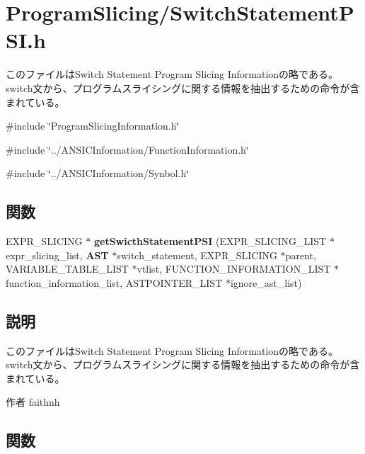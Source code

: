 \section{ProgramSlicing/SwitchStatementPSI.h}
\label{SwitchStatementPSI_8h}


このファイルはSwitch Statement Program Slicing Informationの略である。 switch文から、プログラムスライシングに関する情報を抽出するための命令が含まれている。  


{\ttfamily \#include \char`\"{}ProgramSlicingInformation.h\char`\"{}}\par
{\ttfamily \#include \char`\"{}../ANSICInformation/FunctionInformation.h\char`\"{}}\par
{\ttfamily \#include \char`\"{}../ANSICInformation/Synbol.h\char`\"{}}\par
\subsection*{関数}
\begin{DoxyCompactItemize}
\item 
EXPR\_\-SLICING $\ast$ {\bf getSwicthStatementPSI} (EXPR\_\-SLICING\_\-LIST $\ast$expr\_\-slicing\_\-list, {\bf AST} $\ast$switch\_\-statement, EXPR\_\-SLICING $\ast$parent, VARIABLE\_\-TABLE\_\-LIST $\ast$vtlist, FUNCTION\_\-INFORMATION\_\-LIST $\ast$function\_\-information\_\-list, ASTPOINTER\_\-LIST $\ast$ignore\_\-ast\_\-list)
\end{DoxyCompactItemize}


\subsection{説明}
このファイルはSwitch Statement Program Slicing Informationの略である。 switch文から、プログラムスライシングに関する情報を抽出するための命令が含まれている。 \begin{DoxyAuthor}{作者}
faithnh 
\end{DoxyAuthor}


\subsection{関数}
